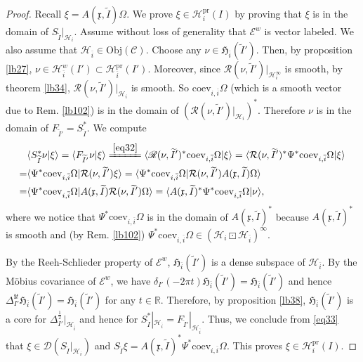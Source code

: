 \documentclass[11pt,b5paper,notitlepage]{article}
\theoremstyle{definition}
\theoremstyle{plain}
\newcommand{\fk}{\mathfrak}
\newcommand{\mc}{\mathcal}
\newcommand{\wtd}{\widetilde}
\newcommand{\ovl}{\overline}
\newcommand{\coev}{\mathrm{coev}}
\newcommand{\Dom}{\scr D}
\newcommand{\bk}[1]{\langle {#1}\rangle}
\newcommand{\scr}{\mathscr}
\newcommand{\im}{\mathbf{i}}
\newcommand{\mbb}{\mathbb}
\newcommand{\Obj}{\mathrm{Obj}}
\newcommand{\pr}{\mathrm{pr}}
\numberwithin{equation}{subsection}
\begin{document}
\begin{proof}
Recall $\xi=A(\fk x,\wtd I)\Omega$. We prove $\xi\in\mc H_i^\pr(I)$ by proving that $\xi$ is in the domain of $S_{\wtd I}|_{\mc H_i}$. Assume without loss of generality that $\scr E^w$ is vector labeled. We also assume that $\mc H_{\ovl i}\in\Obj(\scr C)$. Choose any $\nu\in\fk H_{\ovl i}(\wtd I')$. Then, by proposition \ref{lb27}, $\nu\in\mc H_{\ovl i}^w(I')\subset\mc H_{\ovl i}^\pr(I')$. Moreover, since $\mc R(\nu,\wtd I')|_{\mc H_i^\infty}$ is smooth, by theorem \ref{lb34}, $\scr R(\nu,\wtd I')|_{\mc H_i}$ is smooth. So $\coev_{i,\ovl i}\Omega$ (which is a smooth vector due to Rem. \ref{lb102}) is in the domain of $(\scr R(\nu,\wtd I')|_{\mc H_i})^*$. Therefore $\nu$ is in the domain of $F_{\wtd I'}=S_{\wtd I}^*$.  We compute
\begin{align}
&\bk{S_{\wtd I}^*\nu|\xi}=\bk{F_{\wtd I'}\nu|\xi}\xlongequal{\eqref{eq32}}  \bk{\scr R(\nu,\wtd I')^*\coev_{i,\ovl i}\Omega|\xi}=\bk{\mc R(\nu,\wtd I')^*\Psi^*\coev_{i,\ovl i}\Omega|\xi}\nonumber\\
=&\bk{\Psi^*\coev_{i,\ovl i}\Omega|\mc R(\nu,\wtd I')\xi}=\bk{\Psi^*\coev_{i,\ovl i}\Omega|\mc R(\nu,\wtd I')A(\fk x,\wtd I)\Omega}\nonumber\\
=&\bk{\Psi^*\coev_{i,\ovl i}\Omega|A(\fk x,\wtd I)\mc R(\nu,\wtd I')\Omega}=\bk{A(\fk x,\wtd I)^*\Psi^*\coev_{i,\ovl i}\Omega|\nu},\label{eq33}
\end{align}
where we notice that $\Psi^*\coev_{i,\ovl i}\Omega$ is in the domain of $A(\fk x,\wtd I)^*$ because $A(\fk x,\wtd I)^*$ is smooth and (by Rem. \ref{lb102}) $\Psi^*\coev_{i,\ovl i}\Omega\in(\mc H_i\boxdot\mc H_{\ovl i})^\infty$. 

By the Reeh-Schlieder property of $\scr E^w$, $\fk H_{\ovl i}(\wtd I')$ is a dense subspace of $\mc H_{\ovl i}$. By the M\"obius covariance of $\scr E^w$, we have $\delta_{I'}(-2\pi t)\fk H_{\ovl i}(\wtd I')=\fk H_{\ovl i}(\wtd I')$ and hence $\Delta_{I'}^{\im t}\fk H_{\ovl i}(\wtd I')=\fk H_{\ovl i}(\wtd I')$ for any $t\in\mbb R$. Therefore, by proposition \ref{lb38}, $\fk H_{\ovl i}(\wtd I')$ is a core for $\Delta_{I'}^{\frac 12}|_{\mc H_{\ovl i}}$ and hence for $S_{\wtd I}^*|_{\mc H_{\ovl i}}=F_{\wtd I'}|_{\mc H_{\ovl i}}$. Thus, we conclude from \eqref{eq33} that $\xi\in\Dom(S_{\wtd I}|_{\mc H_i})$ and $S_{\wtd I}\xi=A(\fk x,\wtd I)^*\Psi^*\coev_{i,\ovl i}\Omega$. This proves $\xi\in\mc H_i^\pr(I)$.
\end{proof}
\end{document}

